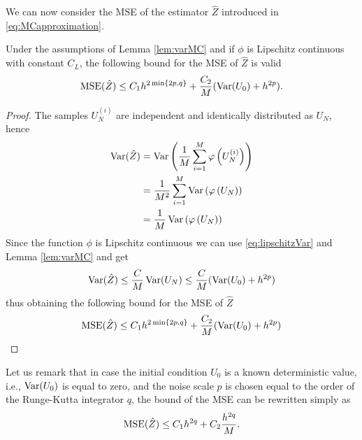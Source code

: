 \noindent We can now consider the MSE of the estimator $\hat Z$ introduced in \eqref{eq:MCapproximation}.
\begin{theorem}\label{prop:MSE} Under the assumptions of Lemma \ref{lem:varMC} and if $\phi$ is Lipschitz continuous with constant $C_L$, the following bound for the MSE of $\hat Z$ is valid
\begin{equation}
\operatorname{MSE}(\hat Z) \leq C_1 h^{2\min\{2p, q\}} + \frac{C_2}{M} (\operatorname{Var}(U_0) + h^{2p}).
\end{equation}	
\end{theorem}
\begin{proof} The samples $U_N^{(i)}$ are independent and identically distributed as $U_N$, hence
\begin{equation}
\begin{aligned}
	\operatorname{Var}(\hat Z) &= \operatorname{Var}\left(\frac{1}{M} \sum_{i = 1}^M \varphi\left(U_N^{(i)}\right)\right) \\
	&= \frac{1}{M^2} \sum_{i = 1}^M \operatorname{Var}\left(\varphi\left(U_N\right)\right) \\
	&= \frac{1}{M} \operatorname{Var}\left(\varphi\left(U_N\right)\right) \\
\end{aligned}
\end{equation}
Since the function $\phi$ is Lipschitz continuous we can use \eqref{eq:lipschitzVar} and Lemma \ref{lem:varMC} and get
\begin{equation}
\operatorname{Var}(\hat Z) \leq \frac{C}{M} \operatorname{Var}(U_N) \leq \frac{C}{M} (\operatorname{Var}(U_0) + h^{2p})
\end{equation}
thus obtaining the following bound for the MSE of $\hat Z$ 
\begin{equation}
	\operatorname{MSE}(\hat Z) \leq C_1 h^{2\min\{2p, q\}} + \frac{C_2}{M} (\operatorname{Var}(U_0) + h^{2p})
\end{equation}
\end{proof}
\begin{remark}
Let us remark that in case the initial condition $U_0$ is a known deterministic value, i.e., $\operatorname{Var}(U_0)$ is equal to zero, and the noise scale $p$ is chosen equal to the order of the Runge-Kutta integrator $q$, the bound of the MSE can be rewritten simply as 
\begin{equation}
	\operatorname{MSE}(\hat Z) \leq C_1 h^{2q} + C_2 \frac{h^{2q}}{M}.
\end{equation}
\end{remark}

